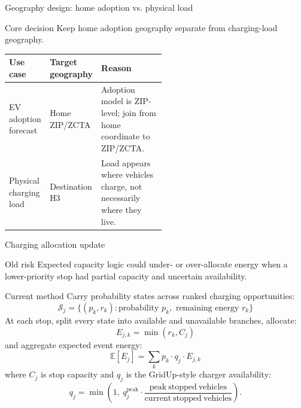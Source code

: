 \documentclass[aspectratio=169]{beamer}
\begin{document}
\begin{frame}{Geography design: home adoption vs. physical load}
\small
\begin{block}{Core decision}
Keep home adoption geography separate from charging-load geography.
\end{block}

\begin{tabularx}{\linewidth}{p{0.26\linewidth}p{0.26\linewidth}Y}
\toprule
\textbf{Use case} & \textbf{Target geography} & \textbf{Reason} \\
\midrule
EV adoption forecast & Home ZIP/ZCTA & Adoption model is ZIP-level; join from home coordinate to ZIP/ZCTA. \\
Physical charging load & Destination H3 & Load appears where vehicles charge, not necessarily where they live. \\
\bottomrule
\end{tabularx}
\end{frame}


\begin{frame}{Charging allocation update}
\footnotesize
\setlength{\abovedisplayskip}{0.25em}
\setlength{\belowdisplayskip}{0.25em}
\begin{block}{Old risk}
Expected capacity logic could under- or over-allocate energy when a lower-priority stop had partial capacity and uncertain availability.
\end{block}

\begin{block}{Current method}
Carry probability states across ranked charging opportunities:
\[
\mathcal{S}_j = \{(p_k, r_k): \text{probability } p_k, \text{ remaining energy } r_k\}
\]
At each stop, split every state into available and unavailable branches, allocate:
\[
E_{j,k}=\min(r_k, C_j)
\]
and aggregate expected event energy:
\[
\mathbb{E}[E_j]=\sum_k p_k \cdot q_j \cdot E_{j,k}
\]
where $C_j$ is stop capacity and $q_j$ is the GridUp-style charger availability:
\[
q_j=\min\left(1,\ q^{\mathrm{peak}}_j\cdot
\frac{\mathrm{peak\ stopped\ vehicles}}{\mathrm{current\ stopped\ vehicles}}\right).
\]
\end{block}
\end{frame}
\end{document}
